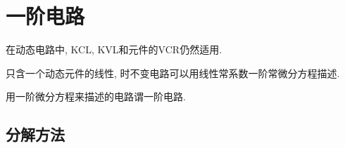 \documentclass{ctexart}
\begin{document}
\section{一阶电路} %
\label{sec:一阶电路}

\begin{cenum}
    \item 在动态电路中, KCL, KVL和元件的VCR仍然适用.
    \item 只含一个动态元件的线性, 时不变电路可以用线性常系数一阶常微分方程描述.
    \item 用一阶微分方程来描述的电路谓一阶电路.
\end{cenum}

\subsection{分解方法} %
\label{sub:分解方法}
\end{document}
